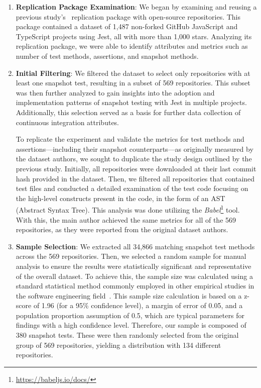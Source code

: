 \documentclass[
	msc, %
	english %
]{../ppgccufmg}
\begin{document}
        \begin{enumerate}

        \item\textbf{Replication Package Examination}: We began by examining and reusing a previous study's~\cite{fujita2023empirical} replication package with open-source repositories. This package contained a dataset of 1,487 non-forked GitHub JavaScript and TypeScript projects using Jest, all with more than 1,000 stars. Analyzing its replication package, we were able to identify attributes and metrics such as number of test methods, assertions, and snapshot methods.

        \item\textbf{Initial Filtering}: We filtered the dataset to select only repositories with at least one snapshot test, resulting in a subset of 569 repositories. This subset was then further analyzed to gain insights into the adoption and implementation patterns of snapshot testing with Jest in multiple projects. Additionally, this selection served as a basis for further data collection of continuous integration attributes. 

        To replicate the experiment and validate the metrics for test methods and assertions—including their snapshot counterparts—as originally measured by the dataset authors, we sought to duplicate the study design outlined by the previous study. Initially, all repositories were downloaded at their last commit hash provided in the dataset. Then, we filtered all repositories that contained test files and conducted a detailed examination of the test code focusing on the high-level constructs present in the code, in the form of an  AST (Abstract Syntax Tree). This analysis was done utilizing the \textit{Babel}\footnote{\url{https://babeljs.io/docs/}} tool. With this, the main author achieved the same metrics for all of the 569 repositories, as they were reported from the original dataset authors.

        \item\textbf{Sample Selection}: We extracted all 34,866 matching snapshot test methods across the 569 repositories. Then, we selected a random sample for manual analysis to ensure the results were statistically significant and representative of the overall dataset. To achieve this, the sample size was calculated using a standard statistical method commonly employed in other empirical studies in the software engineering field~\cite{malhotra2016empirical, cruz2019mobile}. This sample size calculation is based on a z-score of 1.96 (for a 95\% confidence level), a margin of error of 0.05, and a population proportion assumption of 0.5, which are typical parameters for findings with a high confidence level. Therefore, our sample is composed of 380 snapshot tests. These were then randomly selected from the original group of 569 repositories, yielding a distribution with 134 different repositories.


\end{enumerate}
\end{document}
